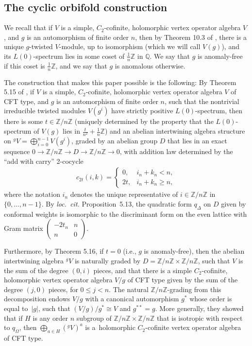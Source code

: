 \documentclass[11pt]{article}
\newcommand{\bQ}{\mathbb{Q}}
\newcommand{\bZ}{\mathbb{Z}}
\theoremstyle{definition}
\begin{document}
\subsection{The cyclic orbifold construction}

We recall that if $V$ is a simple, $C_2$-cofinite, holomorphic vertex operator algebra $V$, and $g$ is an automorphism of finite order $n$, then by Theorem 10.3 of \cite{DLM97}, there is a unique $g$-twisted $V$-module, up to isomorphism (which we will call $V(g)$), and its $L(0)$-spectrum lies in some coset of $\frac{1}{n}\bZ$ in $\bQ$. We say that $g$ is anomaly-free if this coset is $\frac{1}{n}\bZ$, and we say that $g$ is anomalous otherwise.

The construction that makes this paper possible is the following: By Theorem 5.15 of \cite{vEMS}, if $V$ is a simple, $C_2$-cofinite, holomorphic vertex operator algebra $V$ of CFT type, and $g$ is an automorphism of finite order $n$, such that the nontrivial irreducible twisted modules $V(g^i)$ have strictly positive $L(0)$-spectrum, then there is some $t \in \bZ/n\bZ$ (uniquely determined by the property that the $L(0)$-spectrum of $V(g)$ lies in $\frac{t}{n^2} + \frac{1}{n}\bZ$) and an abelian intertwining algebra structure on ${}^gV = \bigoplus_{i=0}^{n-1} V(g^i)$, graded by an abelian group $D$ that lies in an exact sequence $0 \to \bZ/n\bZ \to D \to \bZ/n\bZ \to 0$, with addition law determined by the ``add with carry'' 2-cocycle
\begin{gather*} c_{2t}(i,k) = \begin{cases} 0, & i_n + k_n < n, \\ 2t, & i_n + k_n \geq n, \end{cases} \end{gather*}
where the notation $i_n$ denotes the unique representative of $i \in \bZ/n\bZ$ in $\{0,\ldots,n-1\}$. By \textit{loc.\ cit.} Proposition~5.13, the quadratic form $q_\Delta$ on $D$ given by conformal weights is isomorphic to the discriminant form on the even lattice with Gram matrix $\left( \begin{smallmatrix} -2t_n & n \\ n & 0 \end{smallmatrix} \right)$.

Furthermore, by Theorem 5.16, if $t=0$ (i.e., $g$ is anomaly-free), then the abelian intertwining algebra ${}^gV$ is naturally graded by $D = \bZ/n\bZ \times \bZ/n\bZ$, such that $V$ is the sum of the degree $(0,i)$ pieces, and that there is a simple $C_2$-cofinite, holomorphic vertex operator algebra $V/g$ of CFT type given by the sum of the degree $(j,0)$ pieces, for $0 \leq j < n$. The natural $\bZ/n\bZ$-grading from this decomposition endows $V/g$ with a canonical automorphism $g^*$ whose order is equal to~$|g|$, such that $(V/g)/g^* \cong V$ and $g^{**} = g$. More generally, they showed that if $H$ is any order $n$ subgroup of $\bZ/n\bZ \times \bZ/n\bZ$ that is isotropic with respect to $q_\Omega$, then $\bigoplus_{a \in H} ({}^gV)^a$ is a~holomorphic $C_2$-cofinite vertex operator algebra of CFT type.
\end{document}
